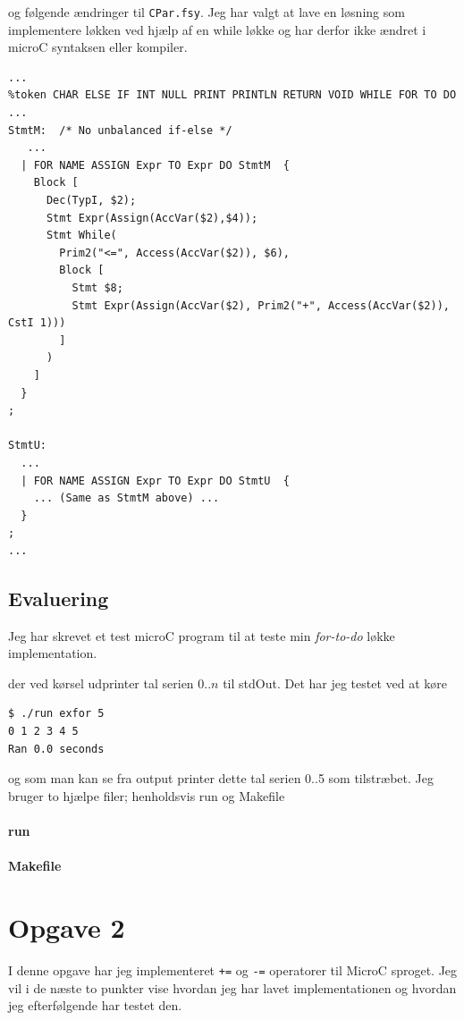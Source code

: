 \documentclass[danish,a4paper]{report}
\begin{document}
og følgende ændringer til \texttt{CPar.fsy}. Jeg har valgt at lave en løsning som implementere løkken ved hjælp af en while løkke og har derfor ikke ændret i microC syntaksen eller kompiler.

\begin{lstlisting}
...
%token CHAR ELSE IF INT NULL PRINT PRINTLN RETURN VOID WHILE FOR TO DO
...
StmtM:  /* No unbalanced if-else */
   ...
  | FOR NAME ASSIGN Expr TO Expr DO StmtM  { 
    Block [ 
      Dec(TypI, $2); 
      Stmt Expr(Assign(AccVar($2),$4)); 
      Stmt While(
        Prim2("<=", Access(AccVar($2)), $6),
        Block [
          Stmt $8; 
          Stmt Expr(Assign(AccVar($2), Prim2("+", Access(AccVar($2)), CstI 1)))
        ]
      )
    ] 
  }
;

StmtU:
  ...
  | FOR NAME ASSIGN Expr TO Expr DO StmtU  { 
    ... (Same as StmtM above) ...
  }
;
...
\end{lstlisting}


\section*{Evaluering}

Jeg har skrevet et test microC program til at teste min \textit{for-to-do} løkke implementation. 



der ved kørsel udprinter tal serien $0..n$ til stdOut. Det har jeg testet ved at køre 

\begin{lstlisting}[language=bash]
$ ./run exfor 5
0 1 2 3 4 5
Ran 0.0 seconds
\end{lstlisting}

og som man kan se fra output printer dette tal serien 0..5 som tilstræbet. Jeg bruger to hjælpe filer; henholdsvis run og Makefile

\subsubsection*{run}


\subsubsection*{Makefile}


\chapter*{Opgave 2}
I denne opgave har jeg implementeret \texttt{+=} og \texttt{-=} operatorer til MicroC sproget. Jeg vil i de næste to punkter vise hvordan jeg har lavet implementationen og hvordan jeg efterfølgende har testet den.
\end{document}
